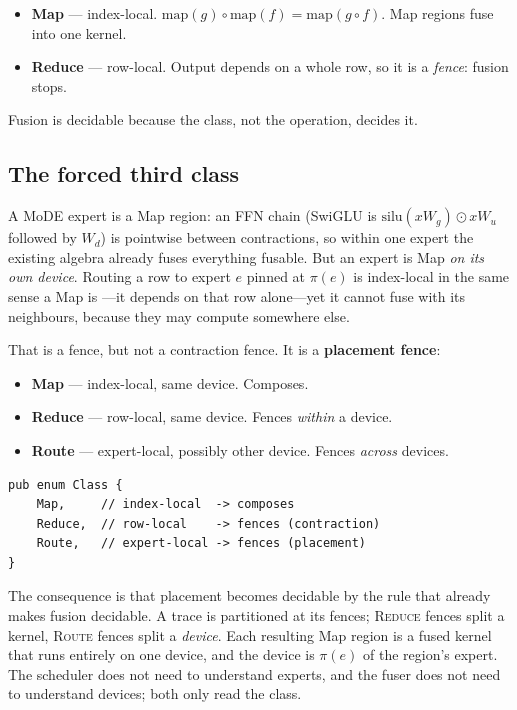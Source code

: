 \documentclass[11pt,a4paper]{article}
\begin{document}
\begin{itemize}
  \item \textbf{Map} --- index-local. $\text{map}(g) \circ \text{map}(f) = \text{map}(g
        \circ f)$. Map regions fuse into one kernel.
  \item \textbf{Reduce} --- row-local. Output depends on a whole row, so it is a
        \emph{fence}: fusion stops.
\end{itemize}

Fusion is decidable because the class, not the operation, decides it.

\subsection{The forced third class}

A MoDE expert is a Map region: an FFN chain (SwiGLU is $\text{silu}(xW_g) \odot xW_u$
followed by $W_d$) is pointwise between contractions, so within one expert the existing
algebra already fuses everything fusable. But an expert is Map \emph{on its own device}.
Routing a row to expert $e$ pinned at $\pi(e)$ is index-local in the same sense a Map is
---it depends on that row alone---yet it cannot fuse with its neighbours, because they may
compute somewhere else.

That is a fence, but not a contraction fence. It is a \textbf{placement fence}:

\begin{itemize}
  \item \textbf{Map} --- index-local, same device. Composes.
  \item \textbf{Reduce} --- row-local, same device. Fences \emph{within} a device.
  \item \textbf{Route} --- expert-local, possibly other device. Fences \emph{across}
        devices.
\end{itemize}

\begin{lstlisting}
pub enum Class {
    Map,     // index-local  -> composes
    Reduce,  // row-local    -> fences (contraction)
    Route,   // expert-local -> fences (placement)
}
\end{lstlisting}

The consequence is that placement becomes decidable by the rule that already makes fusion
decidable. A trace is partitioned at its fences; \textsc{Reduce} fences split a kernel,
\textsc{Route} fences split a \emph{device}. Each resulting Map region is a fused kernel
that runs entirely on one device, and the device is $\pi(e)$ of the region's expert. The
scheduler does not need to understand experts, and the fuser does not need to understand
devices; both only read the class.
\end{document}
